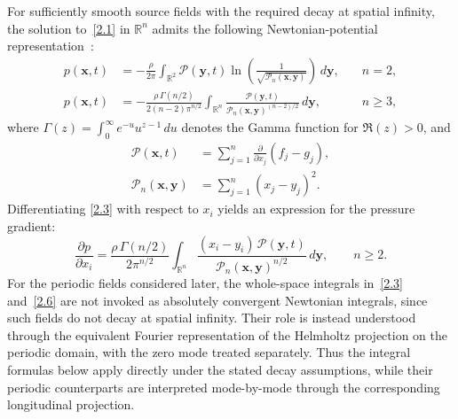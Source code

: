 \documentclass[11pt]{jfm}
\numberwithin{equation}{section}
\begin{document}
For sufficiently smooth source fields with the required decay at spatial infinity, the solution
to~\eqref{2.1} in $\mathbb{R}^n$ admits the following Newtonian-potential representation~\citep{pol}:
\begin{equation}
\label{2.3}
\begin{aligned}
p(\boldsymbol{x}, t) &= -\frac{\rho}{2\pi} \int_{\mathbb{R}^2} \mathcal{P}( \boldsymbol{y}, t ) \ln \left( \frac{1}{\sqrt{\mathcal{P}_n(\boldsymbol{x}, \boldsymbol{y})}} \right) \, d\boldsymbol{y}, \quad &n = 2, \\
p(\boldsymbol{x}, t) &= -\frac{ \rho \, \Gamma(n/2) }{2(n - 2)\pi^{n/2}} \int_{\mathbb{R}^n} \frac{ \mathcal{P}(\boldsymbol{y}, t) }{ \mathcal{P}_n(\boldsymbol{x}, \boldsymbol{y})^{(n - 2)/2} } \, d\boldsymbol{y}, \quad &n \geq 3,
\end{aligned}
\end{equation}
where \( \Gamma(z) = \int_0^\infty e^{-u} u^{z - 1} \, du \) denotes the Gamma function for \( \Re(z) > 0 \), and
\begin{align}
\label{2.4}
\mathcal{P}(\boldsymbol{x}, t) &= \sum_{j=1}^n \frac{\partial}{\partial x_j}(f_j - g_j), \\
\label{2.5}
\mathcal{P}_n(\boldsymbol{x}, \boldsymbol{y}) &= \sum_{j=1}^n (x_j - y_j)^2.
\end{align}
Differentiating \eqref{2.3} with respect to \( x_i \) yields an expression for the pressure gradient:
\begin{equation}
\label{2.6}
\frac{\partial p}{\partial x_i} = \frac{ \rho \, \Gamma(n/2) }{ 2\pi^{n/2} } \int_{\mathbb{R}^n} \frac{(x_i - y_i) \, \mathcal{P}(\boldsymbol{y}, t)}{ \mathcal{P}_n(\boldsymbol{x}, \boldsymbol{y})^{n/2} } \, d\boldsymbol{y}, \qquad n \geq 2.
\end{equation}
For the periodic fields considered later, the whole-space integrals in~\eqref{2.3}
and~\eqref{2.6} are not invoked as absolutely convergent Newtonian integrals, since such fields
do not decay at spatial infinity. Their role is instead understood through the equivalent Fourier
representation of the Helmholtz projection on the periodic domain, with the zero mode treated
separately. Thus the integral formulas below apply directly under the stated decay assumptions,
while their periodic counterparts are interpreted mode-by-mode through the corresponding
longitudinal projection.
\end{document}
